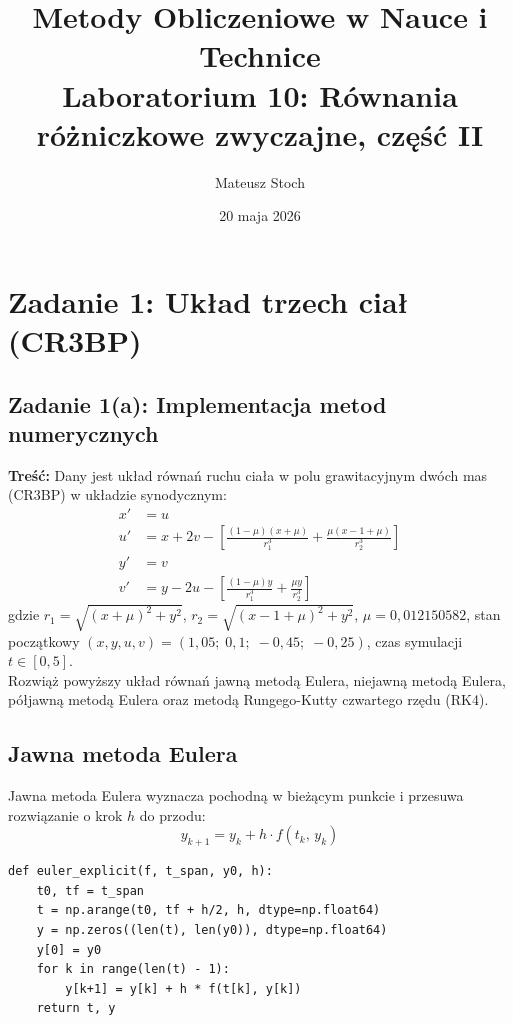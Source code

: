 \documentclass[12pt, a4paper]{article}
\title{
  \textbf{Metody Obliczeniowe w Nauce i Technice} \\[0.5em]
  \large Laboratorium 10: Równania różniczkowe zwyczajne, część II
}
\author{Mateusz Stoch}
\date{20 maja 2026}
\begin{document}
\maketitle

\section{Zadanie 1: Układ trzech ciał (CR3BP)}

\subsection{Zadanie 1(a): Implementacja metod numerycznych}

\textbf{Treść:} Dany jest układ równań ruchu ciała w polu grawitacyjnym dwóch mas (CR3BP) w układzie synodycznym:
\begin{align*}
  x' &= u \\
  u' &= x + 2v - \left[\frac{(1-\mu)(x+\mu)}{r_1^3} + \frac{\mu(x-1+\mu)}{r_2^3}\right] \\
  y' &= v \\
  v' &= y - 2u - \left[\frac{(1-\mu)y}{r_1^3} + \frac{\mu y}{r_2^3}\right]
\end{align*}
gdzie $r_1 = \sqrt{(x+\mu)^2 + y^2}$, $r_2 = \sqrt{(x-1+\mu)^2 + y^2}$, $\mu = 0{,}012150582$, stan początkowy $(x, y, u, v) = (1{,}05;\; 0{,}1;\; -0{,}45;\; -0{,}25)$, czas symulacji $t \in [0, 5]$. \\
Rozwiąż powyższy układ równań jawną metodą Eulera, niejawną metodą Eulera, półjawną metodą Eulera oraz metodą Rungego-Kutty czwartego rzędu (RK4).

\subsection{Jawna metoda Eulera}

Jawna metoda Eulera wyznacza pochodną w bieżącym punkcie i przesuwa rozwiązanie o krok $h$ do przodu:
\[
  y_{k+1} = y_k + h \cdot f(t_k,\, y_k)
\]

\begin{lstlisting}[caption={Implementacja jawnej metody Eulera}]
def euler_explicit(f, t_span, y0, h):
    t0, tf = t_span
    t = np.arange(t0, tf + h/2, h, dtype=np.float64)
    y = np.zeros((len(t), len(y0)), dtype=np.float64)
    y[0] = y0
    for k in range(len(t) - 1):
        y[k+1] = y[k] + h * f(t[k], y[k])
    return t, y
\end{lstlisting}
\end{document}
